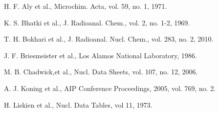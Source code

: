 \documentclass[5p]{elsarticle}
\begin{document}
% 
% 
% 
% 
% 
% 
%  
% 
% 
% 
% 
% 



% 
% 
% 
% 
% 





H. F. Aly et al., Microchim. Acta, vol. 59, no. 1, 1971.

K. S. Bhatki et al., J. Radioanal. Chem., vol. 2, no. 1-2, 1969.

T. H. Bokhari et al., J. Radioanal. Nucl. Chem., vol. 283, no. 2, 2010.

J. F. Briesmeister et al., Los Alamos National Laboratory, 1986.

M. B. Chadwick,et al., Nucl. Data Sheets, vol. 107, no. 12, 2006.

A. J. Koning et al., AIP Conference Proceedings, 2005, vol. 769, no. 2.

H. Liskien et al., Nucl. Data Tables, vol 11, 1973.
\end{document}
